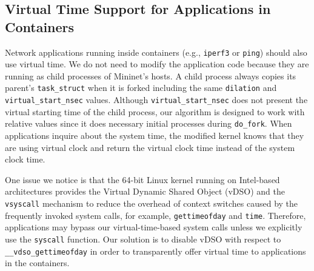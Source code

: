 \subsection{Virtual Time Support for Applications in Containers}
\label{Sub-Sec-ModificationApplications}
Network applications running inside containers (e.g., \texttt{iperf3}\cite{iperf3} or \texttt{ping}) should also use virtual time. 
We do not need to modify the application code because they are running as child processes of Mininet's hosts. 
A child process always copies its parent's \texttt{task\_struct} when it is forked including the same \texttt{dilation} and \texttt{virtual\_start\_nsec} values. 
Although \texttt{virtual\_start\_nsec} does not present the virtual starting time of the child process, our algorithm is designed to work with relative values since it does necessary initial processes during \texttt{do\_fork}. 
When applications inquire about the system time, the modified kernel knows that they are using virtual clock and return the virtual clock time instead of the system clock time.

One issue we notice is that the 64-bit Linux kernel running on Intel-based architectures provides the Virtual Dynamic Shared Object (vDSO) and the \texttt{vsyscall} mechanism to reduce the overhead of context switches caused by the frequently invoked system calls, for example, \texttt{gettimeofday} and \texttt{time}\cite{VDSO}. 
Therefore, applications may bypass our virtual-time-based system calls unless we explicitly use the \texttt{syscall} function. Our solution is to disable vDSO with respect to \texttt{\_\_vdso\_gettimeofday} in order to transparently offer virtual time to applications in the containers.
